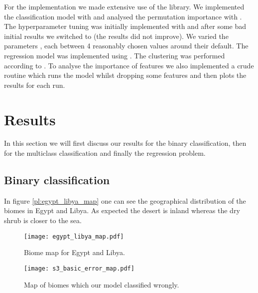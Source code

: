 For the implementation we made extensive use of the  library. We implemented the classification model with  and
analysed the permutation importance with .
The hyperparameter tuning was initially implemented with  and after some bad initial results we switched to 
(the results did not improve).
We varied the parameters , 
 each between 4 reasonably chosen values around their default.
The regression model was implemented using .
The clustering was performed according to \cite{Clustering}.
To analyse the importance of features we also implemented a crude routine which runs the model whilst dropping some features
and then plots the results for each run.


\section{Results}

In this section we will first discuss our results for the binary classification, then for the multiclass classification
and finally the regression problem.

\subsection{Binary classification}

In figure \ref{pl:egypt_libya_map} one can see the geographical distribution of the biomes in Egypt and
 Libya. As expected the desert is inland whereas the dry shrub is closer to the sea.
\begin{figure}[h]
  \centering
  \begin{minipage}{0.5\textwidth}
    \centering
    \texttt{[image: egypt\_libya\_map.pdf]}
    \caption{Biome map for Egypt and Libya.}
    \label{pl:egypt_libya_map}
  \end{minipage}
  \hfill
  \begin{minipage}{0.4\textwidth}
    \centering
    \texttt{[image: s3\_basic\_error\_map.pdf]}
    \caption{Map of biomes which our model classified wrongly.}
    \label{pl:s3_basic_error_map}
  \end{minipage}
\end{figure}

